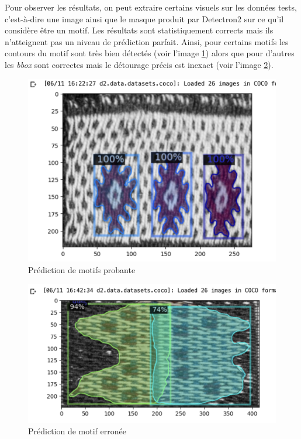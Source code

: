 \documentclass[a4paper, twoside, 12pt]{book}
\begin{document}
Pour observer les résultats, on peut extraire certains visuels sur les données tests, c'est-à-dire une image ainsi que le masque produit par Detectron2 sur ce qu'il considère être un motif. Les résultats sont statistiquement corrects mais ils n'atteignent pas un niveau de prédiction parfait. Ainsi, pour certains motifs les contours du motif sont très bien détectés (voir l'image \ref{predViz}) alors que pour d'autres les \textit{bbox} sont correctes mais le détourage précis est inexact (voir l'image \ref{predVizAmbig}). 

\begin{figure}[!h]
    \centering
    \includegraphics[width=13cm]{images/predViz3.png}
    \caption{Prédiction de motifs probante}
    \label{predViz} 
\end{figure}

\begin{figure}[!h]
    \centering
    \includegraphics[width=13cm]{images/predVizAmbig.png}
    \caption{Prédiction de motif erronée}
    \label{predVizAmbig} 
\end{figure}
\end{document}
